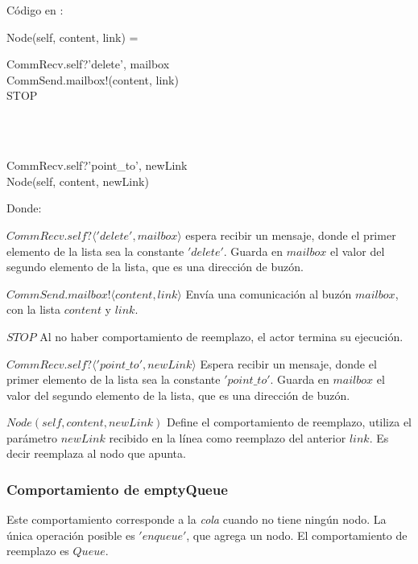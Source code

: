 Código en \CSP:

\begin{process}
Node(self, content, link) = \\ \quad
  \begin{block}
  CommRecv.self?\langle 'delete', mailbox \rangle \then \\
  CommSend.mailbox!(content, link) \then \\
  STOP
  \end{block} \\

  \Extchoice \\ \quad
  
  \begin{block}
  CommRecv.self?\langle 'point\_to', newLink\rangle \then \\
  Node(self, content, newLink)
  \end{block}
\end{process}

Donde: 

\begin{description}
 \item $CommRecv.self?\langle 'delete', mailbox \rangle$ espera recibir un mensaje, donde el primer elemento de la lista sea la constante $'delete'$. Guarda en $mailbox$ el valor del segundo elemento de la lista, que es una dirección de buzón.
 \item $CommSend.mailbox!\langle content, link \rangle$ Envía una comunicación al buzón $mailbox$, con la lista $content$ y $link$.
 \item $STOP$ Al no haber comportamiento de reemplazo, el actor termina su ejecución.
 \item $CommRecv.self?\langle 'point\_to', newLink \rangle$ Espera recibir un mensaje, donde el primer elemento de la lista sea la constante $'point\_to'$. Guarda en $mailbox$ el valor del segundo elemento de la lista, que es una dirección de buzón.
 \item $Node(self, content, newLink)$ Define el comportamiento de reemplazo, utiliza el parámetro $newLink$ recibido en la línea como reemplazo del anterior $link$. Es decir reemplaza al nodo que apunta.
\end{description}

\subsubsection*{Comportamiento de emptyQueue}
Este comportamiento corresponde a la \textit{cola} cuando no tiene ningún nodo. La única operación posible es $'enqueue'$, que agrega un nodo. El comportamiento de reemplazo es $Queue$.

